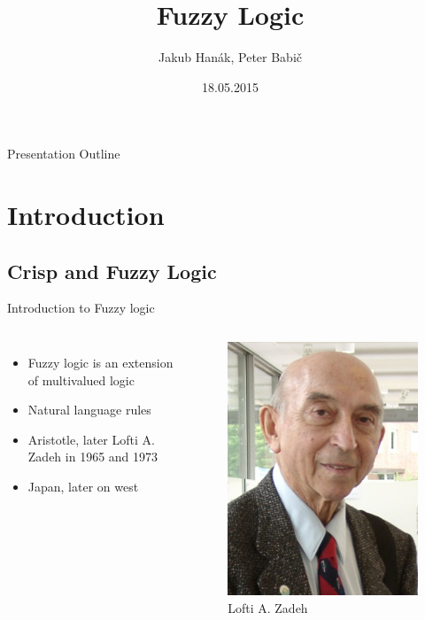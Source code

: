 \documentclass[hyperref={unicode}]{beamer}
\title[Fuzzy logic]{Fuzzy Logic}
\author{Jakub Hanák, Peter Babič}
\institute{Technical University of Košice, Slovakia}
\date{18.05.2015}
\begin{document}
\boldmath


\begin{frame}
	\titlepage
\end{frame}

\begin{frame}{Presentation Outline}
  \tableofcontents
\end{frame}



\section{Introduction}


\subsection{Crisp and Fuzzy Logic}

\begin{frame}{Introduction to Fuzzy logic}
	\begin{columns}
		\begin{itemize}
		\item Fuzzy logic is an extension of multivalued logic
		\item Natural language rules
		\item Aristotle, later Lofti A. Zadeh in 1965 and 1973
		\item Japan, later on west
		\end{itemize}

		\begin{figure}[b]
		\includegraphics{lofti}
		\caption{Lofti A. Zadeh}
		\end{figure}
	\end{columns}
\end{frame}
\end{document}
